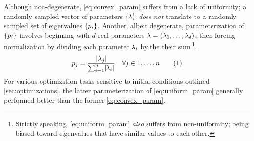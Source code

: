 \documentclass[aps, 10pt, english, twoside, pra, nofootinbib, tightenlines, longbibliography]{revtex4-1}
\begin{document}
    Although non-degenerate, \cref{eq:convex_param} suffers from a lack of uniformity; a randomly sampled vector of parameters $\bc{\lambda}$ \textit{does not} translate to a randomly sampled set of eigenvalues $\bc{p_i}$. Another, albeit degenerate, parameterization of $\bc{p_i}$ involves beginning with $d$ real parameters $\lambda = \br{\lambda_1, \ldots, \lambda_d}$, then forcing normalization by dividing each parameter $\lambda_i$ by the their sum.\footnote{Strictly speaking, \cref{eq:uniform_param} \textit{also} suffers from non-uniformity; being biased toward eigenvalues that have similar values to each other.}.
    \[ p_j = \f{\abs{\lambda_j}}{\sum_{i=1}^{n} \abs{\lambda_i}} \quad \forall j \in 1, \ldots, n \eq \label{eq:uniform_param} \]
    For various optimization tasks sensitive to initial conditions outlined \cref{sec:optimizations}, the latter parameterization of \cref{eq:uniform_param} generally performed better than the former \cref{eq:convex_param}.
\end{document}
